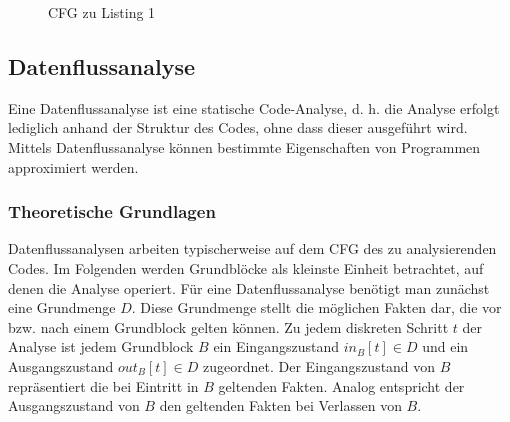 \begin{figure}[H]
\centering
{}
\caption{CFG zu Listing 1}
\end{figure}

\par

\subsection{Datenflussanalyse}
Eine Datenflussanalyse ist eine statische Code-Analyse, d. h. die Analyse erfolgt lediglich anhand der Struktur des Codes, ohne dass dieser ausgeführt wird. 
Mittels Datenflussanalyse können bestimmte Eigenschaften von Programmen approximiert werden.

\subsubsection{Theoretische Grundlagen}

Datenflussanalysen arbeiten typischerweise auf dem CFG des zu analysierenden Codes.
Im Folgenden werden Grundblöcke als kleinste Einheit betrachtet, auf denen die Analyse operiert.
Für eine Datenflussanalyse benötigt man zunächst eine Grundmenge $D$.
Diese Grundmenge stellt die möglichen Fakten dar, die vor bzw. nach einem Grundblock gelten können.
Zu jedem diskreten Schritt $t$ der Analyse ist jedem Grundblock $B$ ein Eingangszustand $in_B[t] \in D$ und ein Ausgangszustand $out_B[t] \in D$ zugeordnet.
Der Eingangszustand von $B$ repräsentiert die bei Eintritt in $B$ geltenden Fakten.
Analog entspricht der Ausgangszustand von $B$ den geltenden Fakten bei Verlassen von $B$.

